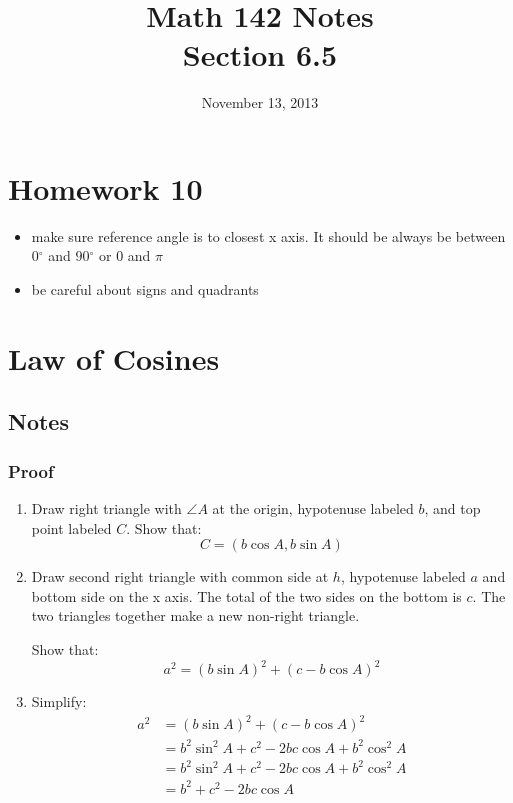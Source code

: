 \documentclass{exam}
\title{Math 142 Notes \\ Section 6.5}
\date{November 13, 2013}
\newcommand{\dg}{\ensuremath{^\circ}}
\begin{document}
  \maketitle
  \tableofcontents

  \section{Homework 10}
  \begin{itemize}
    \item make sure reference angle is to closest x axis.  It should be always be between $0 \dg$ and $90 \dg$ or
      $0$ and $\pi$

    \item be careful about signs and quadrants
  \end{itemize}

  \section{Law of Cosines}

  \subsection{Notes}

  \subsubsection{Proof}
  \begin{enumerate}
    \item Draw right triangle with $\angle A$ at the origin, hypotenuse labeled $b$, and top point labeled $C$.  Show that:
      \[
        C = (b \cos A, b \sin A)
      \]

    \item Draw second right triangle with common side at $h$, hypotenuse labeled $a$ and bottom side on the x axis.  The
      total of the two sides on the bottom is $c$.  The two triangles together make a new non-right triangle. 
      
      Show that:
      \[
        a^2 = \left( b \sin A \right)^2 + \left( c - b \cos A \right)^2 
      \]

    \item Simplify:
      \begin{align*}
        a^2 & = \left( b \sin A \right)^2 + \left( c - b \cos A \right)^2  \\
            & = b^2 \sin^2 A + c^2 - 2bc \cos A  + b^2 \cos^2 A \\
            & = b^2 \sin^2 A + c^2 - 2bc \cos A  + b^2 \cos^2 A \\
            & = b^2 + c^2 - 2bc \cos A \\
      \end{align*}

  \end{enumerate}
  
\end{document}
